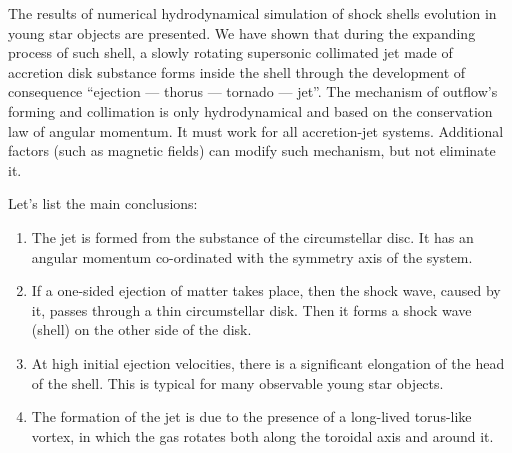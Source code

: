 \begin{thebibliography}{99}
\mkpapere

\mkpapere

\mkpapere

\mkpapere

\mkpapere
\end{thebibliography}

\begin{summary} \!\!\!The results of numerical hydrodynamical simulation of shock shells
evolution in young star objects are presented. We have shown that during the
expanding process of such shell, a slowly rotating supersonic collimated jet made of accretion disk substance forms inside the shell through the development of consequence ``ejection --- thorus --- tornado --- jet''. The mechanism
of outflow's forming and collimation is only hydrodynamical and
based on the conservation law of angular momentum. It must work
for all accretion-jet systems. Additional factors (such as magnetic fields)
can modify such mechanism, but not eliminate it.

Let's list the main conclusions:
\begin{enumerate}
\item The jet is formed from the substance of the circumstellar disc. It has an angular momentum co-ordinated with the symmetry axis of the system.

\item If a one-sided ejection of matter takes place, then the shock wave, caused by it, passes through a thin circumstellar disk. Then it forms a shock wave (shell) on the other side of the disk.

\item At high initial ejection velocities, there is a significant elongation of the head of the shell. This is typical for many observable young star objects.

\item The formation of the jet is due to the presence of a long-lived torus-like vortex, in which the gas rotates both along the toroidal axis and around it.
\end{enumerate}
\end{summary}

%
